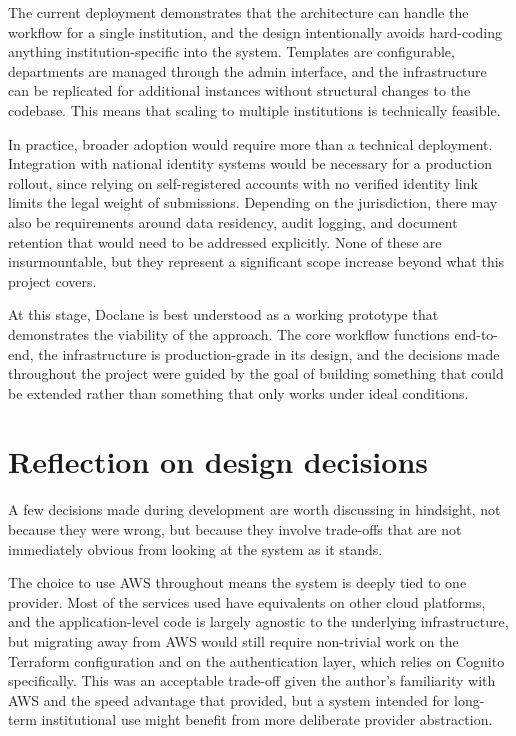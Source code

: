 \par The current deployment demonstrates that the architecture can handle the workflow for a single institution, and the design intentionally avoids hard-coding anything institution-specific into the system. Templates are configurable, departments are managed through the admin interface, and the infrastructure can be replicated for additional instances without structural changes to the codebase. This means that scaling to multiple institutions is technically feasible.

\par In practice, broader adoption would require more than a technical deployment. Integration with national identity systems would be necessary for a production rollout, since relying on self-registered accounts with no verified identity link limits the legal weight of submissions. Depending on the jurisdiction, there may also be requirements around data residency, audit logging, and document retention that would need to be addressed explicitly. None of these are insurmountable, but they represent a significant scope increase beyond what this project covers.

\par At this stage, Doclane is best understood as a working prototype that demonstrates the viability of the approach. The core workflow functions end-to-end, the infrastructure is production-grade in its design, and the decisions made throughout the project were guided by the goal of building something that could be extended rather than something that only works under ideal conditions.

\section{Reflection on design decisions}

\par A few decisions made during development are worth discussing in hindsight, not because they were wrong, but because they involve trade-offs that are not immediately obvious from looking at the system as it stands.

\par The choice to use AWS throughout means the system is deeply tied to one provider. Most of the services used have equivalents on other cloud platforms, and the application-level code is largely agnostic to the underlying infrastructure, but migrating away from AWS would still require non-trivial work on the Terraform configuration and on the authentication layer, which relies on Cognito specifically. This was an acceptable trade-off given the author's familiarity with AWS and the speed advantage that provided, but a system intended for long-term institutional use might benefit from more deliberate provider abstraction.

